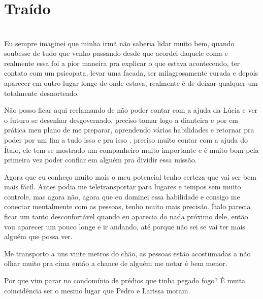 
    
	
	
	\newpage
	
	
	\ifdefined\useChapters
	\chapter{Traído}

\else
\chapter{}
\fi

Eu sempre imaginei que minha irmã não saberia lidar muito bem, quando soubesse de tudo que venho passando desde que acordei daquele coma e realmente essa foi a pior maneira pra explicar o que estava acontecendo, ter contato com um psicopata, levar uma facada, ser milagrosamente curada e depois aparecer em outro lugar longe de onde estava, realmente é de deixar qualquer um totalmente desnorteado.

Não posso ficar aqui reclamando de não poder contar com a ajuda da Lúcia e ver o futuro se desenhar desgovernado, preciso tomar logo a dianteira e por em prática meu plano de me preparar, aprendendo várias habilidades e retornar pra poder por um fim a tudo isso e pra isso , preciso muito contar com a ajuda do Ítalo, ele tem se mostrado um companheiro muito importante e é muito bom pela primeira vez poder confiar em alguém pra dividir essa missão.

Agora que eu conheço muito mais o meu potencial tenho certeza que vai ser bem mais fácil. Antes podia me teletransportar para lugares e tempos sem muito controle, mas agora não, agora que eu dominei essa habilidade e consigo me conectar mentalmente com as pessoas, tenho muito mais precisão. Ítalo parecia ficar um tanto desconfortável quando eu aparecia do nada próximo dele, então vou aparecer um pouco longe e ir andando, até porque não sei se vai ter mais alguém que possa ver.

Me transporto a uns vinte metros do chão, as pessoas estão acostumadas a não olhar muito pra cima então a chance de alguém me notar é bem menor.

Por que vim parar no condomínio de prédios que tinha pegado fogo? É muita coincidência ser o mesmo lugar que Pedro e Larissa moram.


